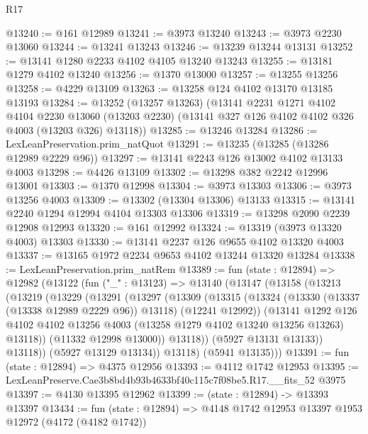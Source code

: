 \begin{lexlean}{R17}
\begin{coremodule}
@13240 := @161 @12989
@13241 := @3973 @13240
@13243 := @3973 @2230 @13060
@13244 := @13241 @13243
@13246 := @13239 @13244 @13131
@13252 := @13141 @1280 @2233 @4102 @4105 @13240 @13243
@13255 := @13181 @1279 @4102 @13240
@13256 := @1370 @13000
@13257 := @13255 @13256
@13258 := @4229 @13109
@13263 := @13258 @124 @4102 @13170 @13185 @13193
@13284 := @13252
    (@13257 @13263)
    (@13141
      @2231
      @1271
      @4102
      @4104
      @2230
      @13060
      (@13203 @2230)
      (@13141 @327 @126 @4102 @4102 @326 @4003 (@13203 @326) @13118))
@13285 := @13246 @13284
@13286 := LexLeanPreservation.prim_natQuot
@13291 := @13235 (@13285 (@13286 @12989 @2229 @96))
@13297 := @13141 @2243 @126 @13002 @4102 @13133 @4003
@13298 := @4426 @13109
@13302 := @13298 @382 @2242 @12996 @13001
@13303 := @1370 @12998
@13304 := @3973 @13303
@13306 := @3973 @13256 @4003
@13309 := @13302 (@13304 @13306) @13133
@13315 := @13141 @2240 @1294 @12994 @4104 @13303 @13306
@13319 := @13298 @2090 @2239 @12908 @12993
@13320 := @161 @12992
@13324 := @13319 (@3973 @13320 @4003) @13303
@13330 := @13141 @2237 @126 @9655 @4102 @13320 @4003
@13337 := @13165 @1972 @2234 @9653 @4102 @13244 @13320 @13284
@13338 := LexLeanPreservation.prim_natRem
@13389 := fun (state : @12894) =>
  @12982
    (@13122
      (fun ("_" : @13123) =>
      @13140
        (@13147
          (@13158
            (@13213
              (@13219
                (@13229
                  (@13291
                    (@13297
                      (@13309
                        (@13315
                          (@13324
                            (@13330 (@13337 (@13338 @12989 @2229 @96)) @13118)
                            (@12241 @12992))
                          (@13141
                            @1292
                            @126
                            @4102
                            @4102
                            @13256
                            @4003
                            (@13258 @1279 @4102 @13240 @13256 @13263)
                            @13118))
                        (@11332 @12998 @13000))
                      @13118))
                  (@5927 @13131 @13133))
                @13118))
            (@5927 @13129 @13134))
          @13118)
        (@5941 @13135)))
@13391 := fun (state : @12894) => @4375 @12956
@13393 := @4112 @1742 @12953
@13395 := LexLeanPreserve.Cae3b8bd4b93b4633bf40c115c7f08be5.R17.__fits_52 @3975
@13397 := @4130 @13395 @12962
@13399 := (state : @12894) -> @13393 @13397
@13434 := fun (state : @12894) =>
  @4148
    @1742
    @12953
    @13397
    @1953
    @12972
    (@4172 (@4182 @1742))

\end{coremodule}
\end{lexlean}

